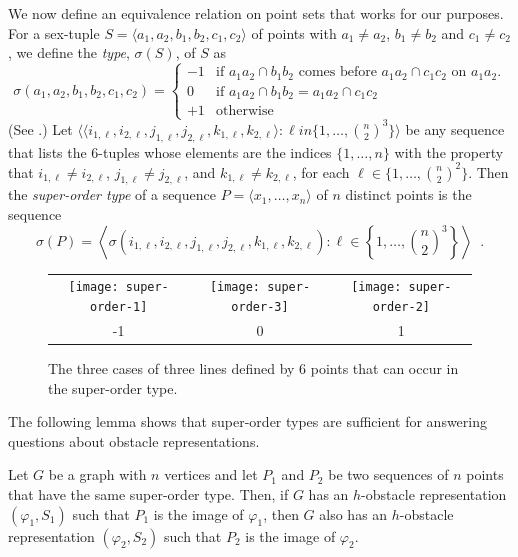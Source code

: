 \documentclass{patmorin}
\begin{document}
We now define an equivalence relation on point sets that works for our
purposes.
For a sex-tuple $S=\langle a_1,a_2,b_1,b_2,c_1,c_2\rangle$ of points
with $a_1\neq a_2$, $b_1\neq b_2$ and $c_1\neq c_2$,
we define the \emph{type}, $\sigma(S)$, of $S$ as
\[
    \sigma(a_1,a_2,b_1,b_2,c_1,c_2) = \left\{\begin{array}{rl}
      -1 & \text{if $a_1a_2\cap b_1b_2$ comes before $a_1a_2\cap c_1c_2$ on $a_1a_2$.} \\
      0 & \text{if $a_1a_2\cap b_1b_2=a_1a_2\cap c_1c_2$}  \\
      +1 & \text{otherwise} 
    \end{array}\right.
\]
(See .)  Let $\langle\langle
i_{1,\ell},i_{2,\ell},j_{1,\ell},j_{2,\ell},k_{1,\ell},k_{2,\ell}\rangle:
\ell in \{1,\ldots,\binom{n}{2}^3\}\rangle$ be any sequence that lists the
6-tuples whose elements are the indices $\{1,\ldots,n\}$ with the property
that $i_{1,\ell}\neq i_{2,\ell}$, $j_{1,\ell}\neq j_{2,\ell}$, and
$k_{1,\ell}\neq k_{2,\ell}$, for each $\ell\in\{1,\ldots,\binom{n}{2}^2\}$.
Then the \emph{super-order type} of a sequence 
$P=\langle x_1,\ldots,x_n\rangle$ of $n$ distinct points is the sequence
\[
   \sigma(P) = \left\langle \sigma\left(i_{1,\ell},i_{2,\ell},
       j_{1,\ell},j_{2,\ell},
       k_{1,\ell},k_{2,\ell}\right) : \ell\in\left\{1,\ldots,\binom{n}{2}^3\right\} \right\rangle \enspace .
\]

\begin{figure}
  \begin{center}
    \begin{tabular}{ccc}
       \texttt{[image: super-order-1]} &
       \texttt{[image: super-order-3]} &
       \texttt{[image: super-order-2]} \\
        -1 & 0 & 1
    \end{tabular}
  \end{center}
  \caption{The three cases of three lines defined by 6 points that can
      occur in the super-order type.}
\end{figure}

The following lemma shows that super-order types are sufficient for answering
questions about obstacle representations.

\begin{lem}
  Let $G$ be a graph with $n$ vertices and let $P_1$ and $P_2$ be two
  sequences of $n$ points that have the same super-order type.
  Then, if $G$ has an $h$-obstacle representation $(\varphi_1,S_1)$
  such that $P_1$ is the image of $\varphi_1$, then $G$ also has an
  $h$-obstacle representation $(\varphi_2,S_2)$ such that $P_2$ is the
  image of $\varphi_2$.
\end{lem}
\end{document}
